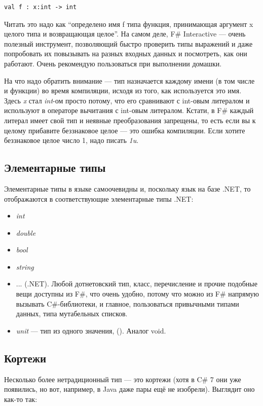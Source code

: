\documentclass[a5paper]{article}
\begin{document}
\begin{verbatim}
val f : x:int -> int
\end{verbatim}

Читать это надо как ``определено имя f типа функция, принимающая аргумент x целого типа и возвращающая целое''. На самом деле, F\# Interactive --- очень полезный инструмент, позволяющий быстро проверить типы выражений и даже попробовать их повызывать на разных входных данных и посмотреть, как они работают. Очень рекомендую пользоваться при выполнении домашки.

На что надо обратить внимание --- тип назначается каждому имени (в том числе и функции) во время компиляции, исходя из того, как используется это имя. Здесь \textit{x} стал \textit{int}-ом просто потому, что его сравнивают с int-овым литералом и используют в операторе вычитания с int-овым литералом. Кстати, в F\# каждый литерал имеет свой тип и неявные преобразования запрещены, то есть если вы к целому прибавите беззнаковое целое --- это ошибка компиляции. Если хотите беззнаковое целое число 1, надо писать \textit{1u}.

\subsection{Элементарные типы}

Элементарные типы в языке самоочевидны и, поскольку язык на базе .NET, то отображаются в соответствующие элементарные типы .NET:

\begin{itemize}
	\item \textit{int}
	\item \textit{double}
	\item \textit{bool}
	\item \textit{string}
	\item ... (.NET). Любой дотнетовский тип, класс, перечисление и прочие подобные вещи доступны из F\#, что очень удобно, потому что можно из F\# напрямую вызывать C\#-библиотеки, и главное, пользоваться привычными типами данных, типа мутабельных списков.
	\item \textit{unit} --- тип из одного значения, (). Аналог void.
\end{itemize}

\subsection{Кортежи}

Несколько более нетрадиционный тип --- это кортежи (хотя в C\# 7 они уже появились, но вот, например, в Java даже пары ещё не изобрели). Выглядит оно как-то так:
\end{document}
